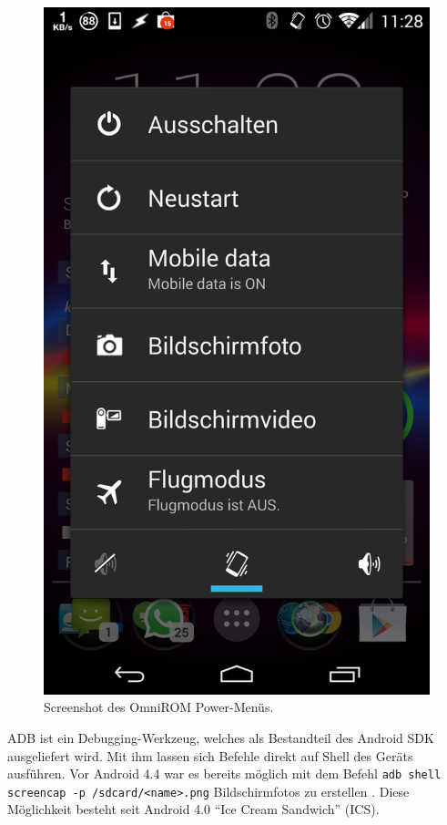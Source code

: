\begin{figure}
	\centering
	\includegraphics[width=\linewidth]{img/screenshot_omnirom_power_menu}
	\caption{Screenshot des OmniROM Power-Menüs.}
	\label{fig:screenshot_omnirom_power_menu}
\end{figure}
\ac{ADB} ist ein Debugging-Werkzeug, welches als Bestandteil des Android \ac{SDK} \cite{AndroidOpenSourceProject.2014c} ausgeliefert wird.
Mit ihm lassen sich Befehle direkt auf Shell des Geräts ausführen.
Vor Android 4.4 war es bereits möglich mit dem Befehl \texttt{adb shell screencap -p /sdcard/<name>.png} Bildschirmfotos zu erstellen \cite[vgl.][]{RandomStuff.2013}.
Diese Möglichkeit besteht seit Android 4.0 \enquote{Ice Cream Sandwich} (ICS).

